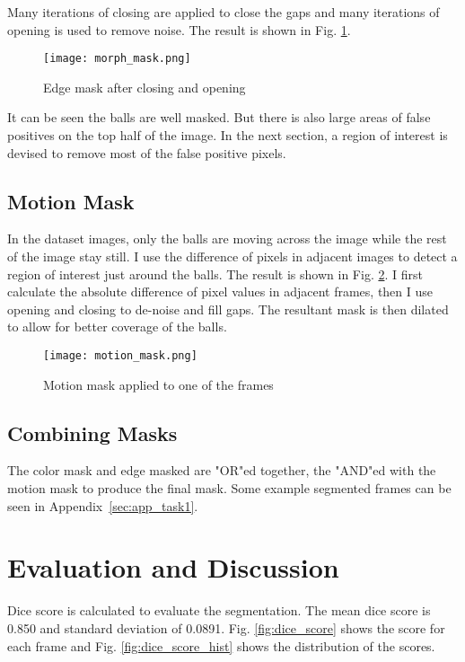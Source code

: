 \documentclass{report}
\begin{document}
Many iterations of closing are applied to close the gaps and many iterations of opening is used to remove noise. The result is shown in Fig. \ref{fig:morph_mask}.

\begin{figure}
    \centering
    \texttt{[image: morph\_mask.png]}
    \caption{Edge mask after closing and opening}
    \label{fig:morph_mask}
\end{figure}

It can be seen the balls are well masked. But there is also large areas of false positives on the top half of the image. In the next section, a region of interest is devised to remove most of the false positive pixels.

\subsection{Motion Mask}

In the dataset images, only the balls are moving across the image while the rest of the image stay still. I use the difference of pixels in adjacent images to detect a region of interest just around the balls. The result is shown in Fig. \ref{fig:motion_mask}. I first calculate the absolute difference of pixel values in adjacent frames, then I use opening and closing to de-noise and fill gaps. The resultant mask is then dilated to allow for better coverage of the balls.

\begin{figure}
    \centering
    \texttt{[image: motion\_mask.png]}
    \caption{Motion mask applied to one of the frames}
    \label{fig:motion_mask}
\end{figure}

\subsection{Combining Masks}

The color mask and edge masked are "OR"ed together, the "AND"ed with the motion mask to produce the final mask. Some example segmented frames can be seen in Appendix~\ref{sec:app_task1}.

\section{Evaluation and Discussion}

Dice score is calculated to evaluate the segmentation. The mean dice score is 0.850 and standard deviation of 0.0891. Fig. \ref{fig:dice_score} shows the score for each frame and Fig. \ref{fig:dice_score_hist} shows the distribution of the scores.
\end{document}
